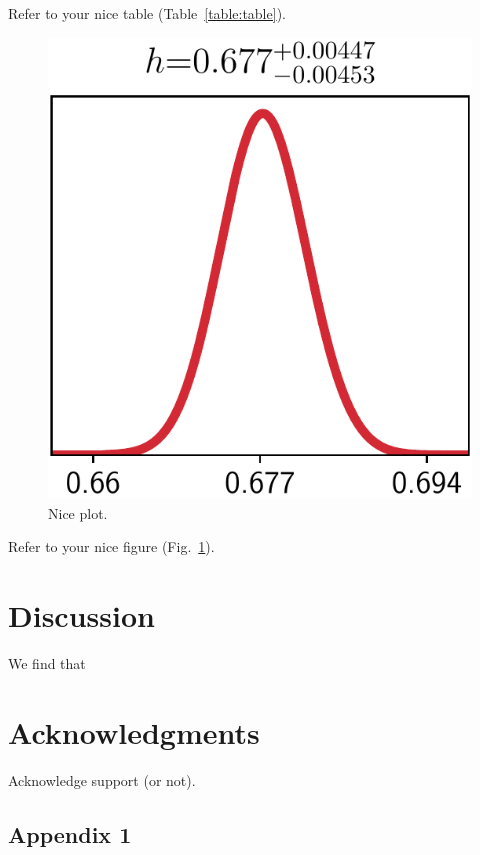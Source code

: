 \documentclass[12pt]{openjournal}
\begin{document}
Refer to your nice table (Table~\ref{table:table}).


\lipsum[14]

\begin{center}
    \begin{figure}[!t]
        \centering
    	\includegraphics[scale=0.3]{figs/probdist.png}
    	\caption{Nice plot. \lipsum[11]}
        \label{fig:fig}
    \end{figure}
\end{center}


Refer to your nice figure (Fig.~\ref{fig:fig}).

\section{Discussion}
\label{sec:concl}


We find that  \lipsum[6]



\section*{Acknowledgments}

Acknowledge support (or not).






\begin{appendix}

\section{Appendix 1}
\label{ap:ap}
\lipsum[4]

\end{appendix}


 
\end{document}
